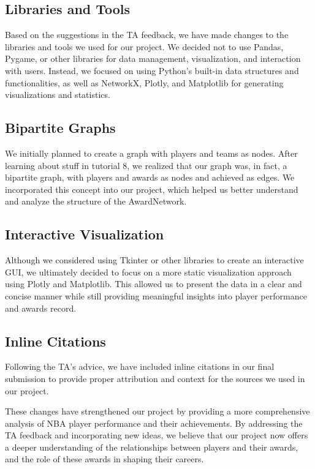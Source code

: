 \documentclass[fontsize=11pt]{article}
\begin{document}
\subsection{Libraries and Tools}
Based on the suggestions in the TA feedback, we have made changes to the libraries and tools we used for our project. We decided not to use Pandas, Pygame, or other libraries for data management, visualization, and interaction with users. Instead, we focused on using Python's built-in data structures and functionalities, as well as NetworkX, Plotly, and Matplotlib for generating visualizations and statistics.

\subsection{Bipartite Graphs}
We initially planned to create a graph with players and teams as nodes. After learning about stuff in tutorial 8, we realized that our graph was, in fact, a bipartite graph, with players and awards as nodes and achieved as edges. We incorporated this concept into our project, which helped us better understand and analyze the structure of the AwardNetwork.

\subsection{Interactive Visualization}
Although we considered using Tkinter or other libraries to create an interactive GUI, we ultimately decided to focus on a more static visualization approach using Plotly and Matplotlib. This allowed us to present the data in a clear and concise manner while still providing meaningful insights into player performance and awards record.

\subsection{Inline Citations}
Following the TA's advice, we have included inline citations in our final submission to provide proper attribution and context for the sources we used in our project.

These changes have strengthened our project by providing a more comprehensive analysis of NBA player performance and their achievements. By addressing the TA feedback and incorporating new ideas, we believe that our project now offers a deeper understanding of the relationships between players and their awards, and the role of these awards in shaping their careers.
\end{document}
